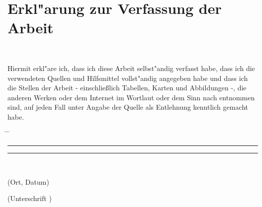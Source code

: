 \chapter*{Erkl"arung zur Verfassung der Arbeit}

\tuinfthesisauthor\\
\tuinfthesisauthoraddress

\vspace*{1.2cm}

Hiermit erkl"are ich, dass ich diese Arbeit selbst"andig verfasst habe, 
dass ich die verwendeten Quellen und Hilfsmittel vollst"andig angegeben 
habe und dass ich die Stellen der Arbeit - einschlie\ss{}lich Tabellen, 
Karten und Abbildungen -, die anderen Werken oder dem Internet im 
Wortlaut oder dem Sinn nach entnommen sind, auf jeden Fall unter Angabe 
der Quelle als Entlehnung kenntlich gemacht habe.\\

\vspace*{2cm}
\begin{tabbing}%
    \hspace{58mm} \= \hspace{28mm} \= \hspace{58mm} \kill
    {\raggedright\rule{58mm}{0.5pt}} \> \> {\raggedright\rule{58mm}{0.5pt}} \\
    \begin{minipage}[t][0.5cm][t]{58mm}
	\vspace{0pt}\sffamily\thesistitlefontnormalsize
	\centering (Ort, Datum)
    \end{minipage}
    \> \>
    \begin{minipage}[t][0.5cm][t]{58mm}
	\vspace{0pt}\sffamily\thesistitlefontnormalsize
	\centering (Unterschrift \tuinfthesisverfassung)
    \end{minipage}
\end{tabbing}

